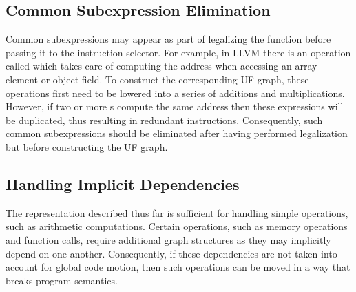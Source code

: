 \subsection{Common Subexpression Elimination}

Common subexpressions may appear as part of legalizing the \gls{function} before
passing it to the \gls{instruction selector}.
%
For example, in \gls{LLVM} there is an \gls{operation} called
 which takes care of computing the address when
accessing an array element or object field.
%
To construct the corresponding \gls{UF graph}, these \glspl{operation} first
need to be lowered into a series of additions and multiplications.
%
However, if two or more s compute the same address
then these expressions will be duplicated, thus resulting in redundant
\glspl{instruction}.
%
Consequently, such common subexpressions should be eliminated after having
performed legalization but before constructing the \gls{UF graph}.


\subsection{Handling Implicit Dependencies}

The representation described thus far is sufficient for handling simple
\glspl{operation}, such as arithmetic computations.
%
Certain \Glspl{operation}, such as memory \glspl{operation} and function calls,
require additional \gls{graph} structures as they may implicitly depend on one
another.
%
Consequently, if these dependencies are not taken into account for \gls{global
  code motion}, then such \glspl{operation} can be moved in a way that breaks
\gls{program} semantics.

